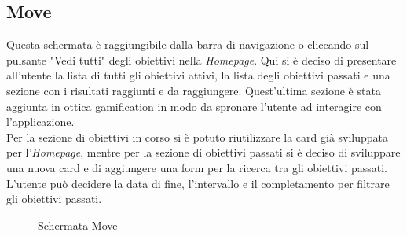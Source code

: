 \subsection{Move}
Questa schermata è raggiungibile dalla barra di navigazione o cliccando sul pulsante "Vedi tutti" degli obiettivi nella \textit{Homepage}. Qui si è deciso di presentare all'utente la lista di tutti gli obiettivi attivi, la lista degli obiettivi passati e una sezione con i risultati raggiunti e da raggiungere. Quest'ultima sezione è stata aggiunta in ottica \gls{gamification} in modo da spronare l'utente ad interagire con l'applicazione.\\
Per la sezione di obiettivi in corso si è potuto riutilizzare la card già sviluppata per l'\textit{Homepage}, mentre per la sezione di obiettivi passati si è deciso di sviluppare una nuova card e di aggiungere una form per la ricerca tra gli obiettivi passati. L'utente può decidere la data di fine, l'intervallo e il completamento per filtrare gli obiettivi passati.\\

\begin{center}
\begin{figure}[H]
\hspace{0.1cm}
\hspace{0.1cm}
\caption{Schermata Move}
\end{figure}
\end{center}
